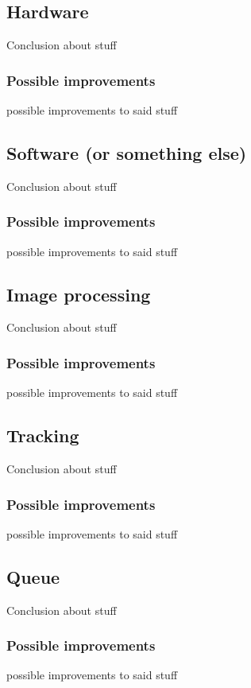 
\subsection{Hardware}
Conclusion about stuff

\subsubsection{Possible improvements}
possible improvements to said stuff

\subsection{Software (or something else)}
Conclusion about stuff

\subsubsection{Possible improvements}
possible improvements to said stuff

\subsection{Image processing}
Conclusion about stuff

\subsubsection{Possible improvements}
possible improvements to said stuff

\subsection{Tracking}
Conclusion about stuff

\subsubsection{Possible improvements}
possible improvements to said stuff

\subsection{Queue}
Conclusion about stuff

\subsubsection{Possible improvements}
possible improvements to said stuff\\














